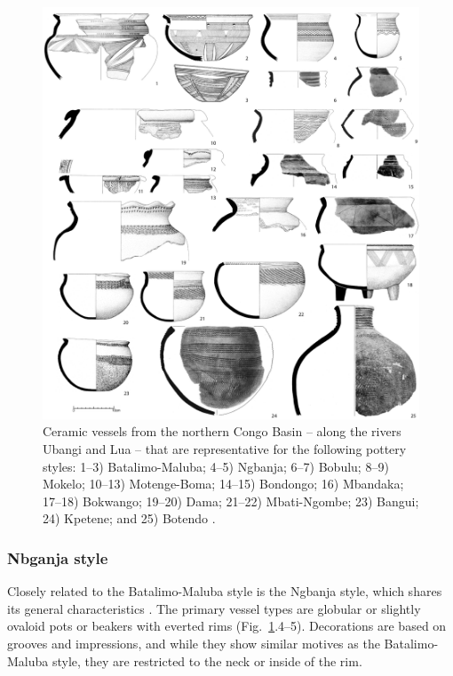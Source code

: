 \documentclass[smallextended,natbib]{svjour3}       %
\begin{document}
\begin{figure}[!tb]
	\includegraphics[width=\textwidth]{Ubangi_Typen.pdf}
	\caption{Ceramic vessels from the northern Congo Basin -- along the rivers Ubangi and Lua -- that are representative for the following pottery styles: 1--3) Batalimo-Maluba; 4--5) Ngbanja; 6--7) Bobulu; 8--9) Mokelo; 10--13) Motenge-Boma; 14--15) Bondongo; 16) Mbandaka; 17--18) Bokwango; 19--20) Dama; 21--22) Mbati-Ngombe; 23) Bangui; 24) Kpetene; and 25) Botendo \citep[75--114,172--181]{Seidensticker.2021e}.}
	\label{fig:ubangi}
\end{figure}

\subsubsection*{Nbganja style}

Closely related to the Batalimo-Maluba style is the Ngbanja style, which shares its general characteristics \citep[82--86]{Seidensticker.2021e}. The primary vessel types are globular or slightly ovaloid pots or beakers with everted rims (Fig.~\ref{fig:ubangi}.4--5). Decorations are based on grooves and impressions, and while they show similar motives as the Batalimo-Maluba style, they are restricted to the neck or inside of the rim.
\end{document}
